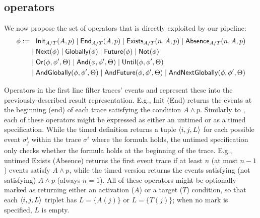 \subsection{\xLTLf operators}\label{sec:xltlf}

We now propose the set of operators that is directly exploited by our pipeline:
\[\begin{split}
\phi:=&\;\;\;\textsf{Init}_{A/T}(A,p)\;|\;\textsf{End}_{A/T}(A,p)\;|\;\textsf{Exists}_{A/T}(n,A,p)\;|\;\textsf{Absence}_{A/T}(n,A,p)\\
     &\;|\; \textsf{Next}(\phi)\;|\; \textsf{Globally}(\phi)\;|\; \textsf{Future}(\phi)\;|\; \textsf{Not}(\phi)\\
     &\;|\; \textsf{Or}(\phi,\phi',\Theta)\;|\; \textsf{And}(\phi,\phi',\Theta)\;|\; \textsf{Until}(\phi,\phi',\Theta)\\
     &\;|\; \textsf{AndGlobally}(\phi,\phi',\Theta)\;|\; \textsf{AndFuture}(\phi,\phi',\Theta)\;|\; \textsf{AndNextGlobally}(\phi,\phi',\Theta)\\
\end{split}\]

Operators in the first line filter traces' events and represent these into the previously-described result representation. 
E.g., \textsf{Init} (\textsf{End}) returns the events at the beginning (end) of each trace satisfying the condition $A\wedge p$. Similarly to \cite{BurattinMS16}, each of these operators might be expressed as either an untimed or as a timed specification. While the timed definition returns a tuple $\braket{i,j,L}$ for each possible event $\sigma^i_j$ within the trace $\sigma^i$ where the formula holds, the untimed specification only checks whether the formula holds at the beginning of the trace. E.g., untimed \textsf{Exists} (\textsf{Absence}) returns the first event trace if at least $n$ (at most $n-1$) events satisfy $A\wedge p$, while the timed version returns the events satisfying (not satisfying) $A\wedge p$ (always $n=1$). All of these operators might be optionally marked as returning either an activation ($A$) or a target ($T$) condition, so that each  $\braket{i,j,L}$ triplet has $L=\{A(j)\}$ or $L=\{T(j)\}$; when no mark is specified, $L$ is empty.


